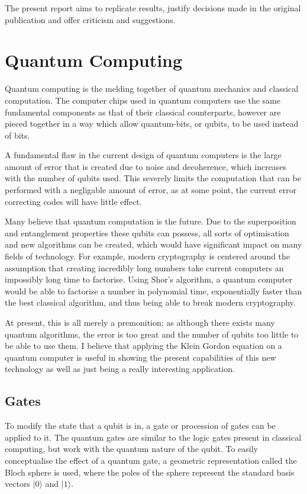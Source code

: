 \documentclass{article}
\begin{document}
The present report aims to replicate results, justify decisions made in the original publication and offer criticism and suggestions. 

\section{Quantum Computing}
Quantum computing is the melding together of quantum mechanics and classical computation. The computer chips used in quantum computers use the same fundamental components as that of their classical counterparts, however are pieced together in a way which allow quantum-bits, or qubits, to be used instead of bits. 

A fundamental flaw in the current design of quantum computers is the large amount of error that is created due to noise and decoherence, which increases with the number of qubits used. This severely limits the computation that can be performed with a negligable amount of error, as at some point, the current error correcting codes will have little effect. 

Many believe that quantum computation is the future. Due to the superposition and entanglement properties these qubits can possess, all sorts of optimisation and new algorithms can be created, which would have significant impact on many fields of technology. For example, modern cryptography is centered around the assumption that creating incredibly long numbers take current computers an impossibly long time to factorise. Using Shor's algorithm, a quantum computer would be able to factorise a number in polynomial time, exponentially faster than the best classical algorithm, and thus being able to break modern cryptography. \cite{minutephysics}

At present, this is all merely a premonition; as although there exists many quantum algorithms, the error is too great and the number of qubits too little to be able to use them. I believe that applying the Klein Gordon equation on a quantum computer is useful in showing the present capabilities of this new technology as well as just being a really interesting application.

\subsection{Gates}
To modify the state that a qubit is in, a gate or procession of gates can be applied to it. The quantum gates are similar to the logic gates present in classical computing, but work with the quantum nature of the qubit. To easily conceptualise the effect of a quantum gate, a geometric representation called the Bloch sphere is used, where the poles of the sphere represent the standard basis vectors $|0\rangle$ and $|1\rangle$.
\end{document}
